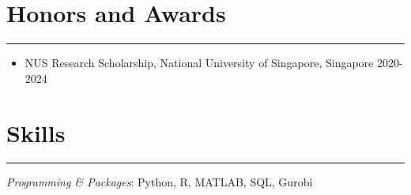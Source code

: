 \documentclass[12pt, a4paper]{article}
\begin{document}
{%

\section*{Honors and Awards}
\vspace*{0.4em}
\hrule height 0.5pt
\begin{itemize}[leftmargin=26pt, itemsep=1pt, parsep=0.5pt, topsep=1pt]

	\item NUS Research Scholarship, National University of Singapore, Singapore \hfill 2020-2024
	



\end{itemize}




\section*{Skills}
\vspace*{0.4em}
\hrule height 0.5pt

{\it Programming \& Packages}: Python, R, MATLAB, SQL, Gurobi

}



\end{document}
